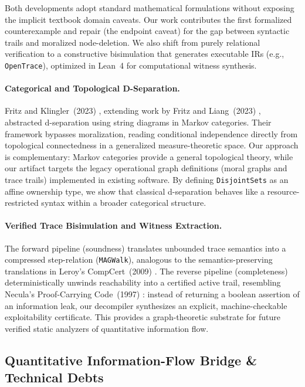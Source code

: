 \documentclass[acmsmall,screen,nonacm]{acmart}
\newcommand{\lean}[1]{\lstinline!#1!}
\begin{document}
Both developments adopt standard mathematical formulations without exposing the implicit textbook domain caveats. Our work contributes the first formalized counterexample and repair (the endpoint caveat) for the gap between syntactic trails and moralized node-deletion. We also shift from purely relational verification to a constructive bisimulation that generates executable IRs (e.g., \lean{OpenTrace}), optimized in Lean~4 for computational witness synthesis.

\paragraph{Categorical and Topological D-Separation.}
Fritz and Klingler~(2023) \cite{fritz2023dseparation}, extending work by Fritz and Liang~(2023) \cite{fritz2023free}, abstracted d-separation using string diagrams in Markov categories. Their framework bypasses moralization, reading conditional independence directly from topological connectedness in a generalized measure-theoretic space. Our approach is complementary: Markov categories provide a general topological theory, while our artifact targets the legacy operational graph definitions (moral graphs and trace trails) implemented in existing software. By defining \lean{DisjointSets} as an affine ownership type, we show that classical d-separation behaves like a resource-restricted syntax within a broader categorical structure.

\paragraph{Verified Trace Bisimulation and Witness Extraction.}
The forward pipeline (soundness) translates unbounded trace semantics into a compressed step-relation (\lean{MAGWalk}), analogous to the semantics-preserving translations in Leroy's CompCert~(2009) \cite{leroy2009formal}. The reverse pipeline (completeness) deterministically unwinds reachability into a certified active trail, resembling Necula's Proof-Carrying Code~(1997) \cite{necula1997proof}: instead of returning a boolean assertion of an information leak, our decompiler synthesizes an explicit, machine-checkable exploitability certificate. This provides a graph-theoretic substrate for future verified static analyzers of quantitative information flow.

\subsection{Quantitative Information-Flow Bridge \& Technical Debts}
\end{document}
